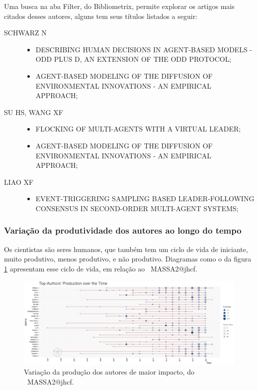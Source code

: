 Uma busca na aba Filter, do Bibliometrix, permite explorar os artigos mais citados desses autores, alguns tem seus títulos listados a seguir:
\begin{description}
    \item [SCHWARZ N] 
    \begin{itemize}
        \item DESCRIBING HUMAN DECISIONS IN AGENT-BASED MODELS - ODD PLUS D, AN EXTENSION OF THE ODD PROTOCOL;
        \item AGENT-BASED MODELING OF THE DIFFUSION OF ENVIRONMENTAL INNOVATIONS - AN EMPIRICAL APPROACH;
    \end{itemize}
    \item [SU HS, WANG XF] 
    \begin{itemize}
        \item FLOCKING OF MULTI-AGENTS WITH A VIRTUAL LEADER;
        \item AGENT-BASED MODELING OF THE DIFFUSION OF ENVIRONMENTAL INNOVATIONS - AN EMPIRICAL APPROACH;
    \end{itemize}
    \item [LIAO XF] 
    \begin{itemize}
        \item EVENT-TRIGGERING SAMPLING BASED LEADER-FOLLOWING CONSENSUS IN SECOND-ORDER MULTI-AGENT SYSTEMS;
    \end{itemize}    
\end{description}

\subsubsection{Variação da produtividade dos autores ao longo do tempo}

Os cientistas são seres humanos, que também tem um ciclo de vida de iniciante, muito produtivo, menos produtivo, e não produtivo.
Diagramas como o da figura \ref{fig:MASSA2-TopAuthorsProductionOverTime} apresentam esse ciclo de vida, em relação ao \dataset\ MASSA2@jhcf.

\begin{figure}
    \centering
    \includegraphics[angle=90,width=1\textwidth,height=0.93\textheight]{experiments/jhcf/PesqBibliogr/SimulacaoMultiagente/WoS-20220203/Metricas/Authors/MASSA2-TopAuthorsProductionOverTime.png}
    \caption{Variação da produção dos autores de maior impacto, do \dataset\ MASSA2@jhcf.}
    \label{fig:MASSA2-TopAuthorsProductionOverTime}
\end{figure}

